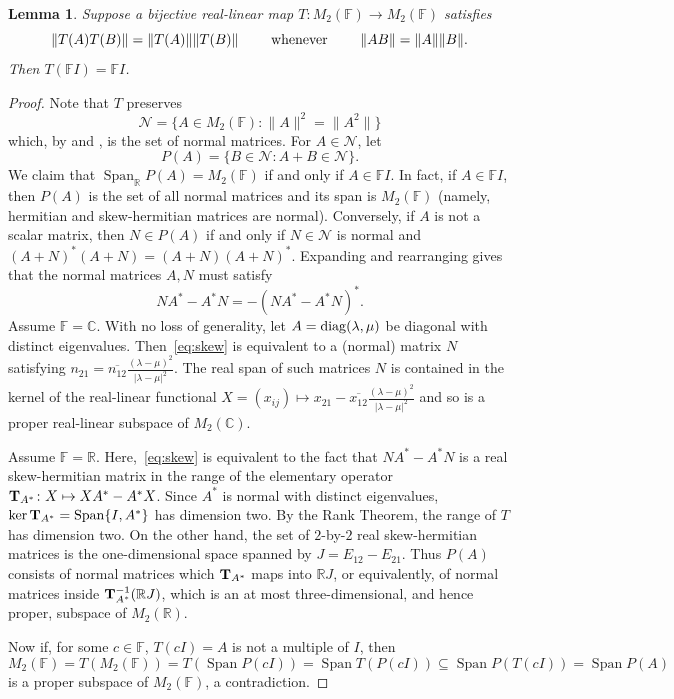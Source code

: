 \documentclass[11pt]{article}
\newtheorem{lemma}[theorem]{Lemma}
\numberwithin{equation}{section}
\def\IF{{\mathbb F}}
\def\IC{{\mathbb C}}
\def\IR{{\mathbb R}}
\def\cN{{\mathcal N}}
\def\span{{\mathop{\mathrm{Span}}\nolimits}}
\def\diag{{\rm diag}}
\def\Span{\mathop{\mathrm{Span}}\nolimits}
\begin{document}
\begin{lemma}\label{L:unital}
 Suppose a bijective real-linear  map $T\colon M_2(\IF) \rightarrow M_2(\IF)$ satisfies
$$\|T(A)T(B)\| = \|T(A)\| \|T(B)\| \qquad \hbox{ whenever } \qquad \|AB\| = \|A\| \|B\|.$$
Then  $T(\IF I) = \IF I$.
\end{lemma}
\begin{proof}
  Note that
$T$ preserves
$$\cN = \{ A \in M_2(\IF) : \|A\|^2 = \|A^2\|\}$$
which, by  \cite[Theorem~2.1]{Ptak} and \cite{GZ},
 is the set of normal matrices.
For $A \in \cN$, let
$$P(A) = \{B \in \cN: A +  B \in \cN \}.$$
We claim that   $\Span_{\IR} P(A) = M_2(\IF)$ if and only if $A \in\IF  I$. In fact, if $A\in\IF I$, then $P(A)$ is the set of all normal matrices and its span is $M_2(\IF)$ (namely, hermitian and skew-hermitian matrices are normal). Conversely,  if $A$ is not a scalar matrix, then $N\in P(A)$ if and only if $N\in\cN$ is normal and $(A+ N)^\ast (A+ N)=(A+ N) (A+ N)^\ast$. Expanding and rearranging gives that the normal matrices $A,N$ must satisfy
 \begin{equation}\label{eq:skew}
NA^\ast-A^\ast N = -(NA^\ast-A^\ast N)^\ast.
\end{equation}
Assume $\IF=\IC$. With no loss of generality,  let
$A=\diag(\lambda,\mu)$ be diagonal with distinct eigenvalues. Then~\eqref{eq:skew} is equivalent to a (normal) matrix $N$ satisfying $n_{21}=\overline{n_{12}} \frac{(\lambda-\mu)^2}{|\lambda-\mu|^2}$. The real span of such matrices $N$ is contained in the kernel of the real-linear functional $X=(x_{ij})\mapsto x_{21}-\overline{x_{12}}\frac{(\lambda-\mu)^2}{|\lambda-\mu|^2}$ and so is a proper real-linear subspace of $M_2(\IC)$.

Assume $\IF=\IR$.  Here,~\eqref{eq:skew} is equivalent to the fact that $NA^\ast-A^\ast N$ is a real skew-hermitian matrix in the range  of the elementary operator ${\bf T}_{A^\ast}\colon X\mapsto XA^\ast-A^\ast X$. Since $A^\ast$ is normal with  distinct eigenvalues, $\ker {\bf T}_{A^\ast} = \span\{I,A^\ast\}$ has dimension two.  By the Rank Theorem, the range of $T$ has dimension two.  On the other hand, the set of $2$-by-$2$ real skew-hermitian matrices is the one-dimensional space spanned by $J=E_{12}-E_{21}$.
 Thus $P(A)$ consists of normal matrices which ${\bf T}_{A^\ast}$ maps into $\IR J$, or equivalently, of normal matrices inside ${\bf T}_{ A^\ast}^{-1}(\IR J)$, which is an at most three-dimensional, and hence proper, subspace of $M_2(\IR)$.

Now if, for some $c\in\IF$,  $T(cI) = A$ is not a multiple of $I$, then
$$M_2(\IF) = T(M_2(\IF)) = T(\Span P(cI)) = \Span T(P(cI)) \subseteq \Span P(T(cI)) = \Span P(A)$$ is a proper subspace of $M_2(\IF)$,
a contradiction.
\end{proof}
\end{document}
